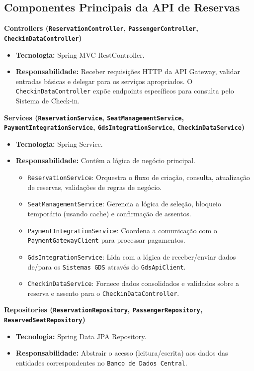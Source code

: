 \subsection{Componentes Principais da API de Reservas}
\label{subsec:c4-componentes-api-reservas-principais}

\textbf{Controllers (\texttt{ReservationController}, \texttt{PassengerController}, \texttt{CheckinDataController})}
\begin{itemize}
    \item \textbf{Tecnologia:} Spring MVC RestController.
    \item \textbf{Responsabilidade:} Receber requisições HTTP da API Gateway, validar entradas básicas e delegar para os serviços apropriados. O \texttt{CheckinDataController} expõe endpoints específicos para consulta pelo Sistema de Check-in.
\end{itemize}

\textbf{Services (\texttt{ReservationService}, \texttt{SeatManagementService}, \texttt{PaymentIntegrationService}, \texttt{GdsIntegrationService}, \texttt{CheckinDataService})}
\begin{itemize}
    \item \textbf{Tecnologia:} Spring Service.
    \item \textbf{Responsabilidade:} Contêm a lógica de negócio principal.
    \begin{itemize}
        \item \texttt{ReservationService}: Orquestra o fluxo de criação, consulta, atualização de reservas, validações de regras de negócio.
        \item \texttt{SeatManagementService}: Gerencia a lógica de seleção, bloqueio temporário (usando cache) e confirmação de assentos.
        \item \texttt{PaymentIntegrationService}: Coordena a comunicação com o \texttt{PaymentGatewayClient} para processar pagamentos.
        \item \texttt{GdsIntegrationService}: Lida com a lógica de receber/enviar dados de/para os \texttt{Sistemas GDS} através do \texttt{GdsApiClient}.
        \item \texttt{CheckinDataService}: Fornece dados consolidados e validados sobre a reserva e assento para o \texttt{CheckinDataController}.
    \end{itemize}
\end{itemize}

\textbf{Repositories (\texttt{ReservationRepository}, \texttt{PassengerRepository}, \texttt{ReservedSeatRepository})}
\begin{itemize}
    \item \textbf{Tecnologia:} Spring Data JPA Repository.
    \item \textbf{Responsabilidade:} Abstrair o acesso (leitura/escrita) aos dados das entidades correspondentes no \texttt{Banco de Dados Central}.
\end{itemize}

